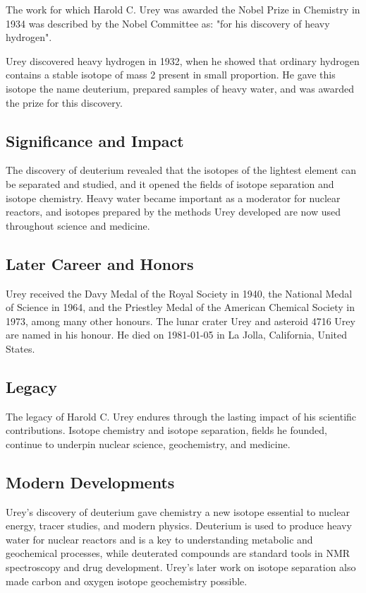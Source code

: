 The work for which Harold C. Urey was awarded the Nobel Prize in Chemistry in 1934 was described by the Nobel Committee as: "for his discovery of heavy hydrogen".

Urey discovered heavy hydrogen in 1932, when he showed that ordinary hydrogen contains a stable isotope of mass 2 present in small proportion.
He gave this isotope the name deuterium, prepared samples of heavy water, and was awarded the prize for this discovery.

\subsection*{Significance and Impact}

The discovery of deuterium revealed that the isotopes of the lightest element can be separated and studied, and it opened the fields of isotope separation and isotope chemistry.
Heavy water became important as a moderator for nuclear reactors, and isotopes prepared by the methods Urey developed are now used throughout science and medicine.

\subsection*{Later Career and Honors}

Urey received the Davy Medal of the Royal Society in 1940, the National Medal of Science in 1964, and the Priestley Medal of the American Chemical Society in 1973, among many other honours.
The lunar crater Urey and asteroid 4716 Urey are named in his honour.
He died on 1981-01-05 in La Jolla, California, United States.

\subsection*{Legacy}

The legacy of Harold C. Urey endures through the lasting impact of his scientific contributions.
Isotope chemistry and isotope separation, fields he founded, continue to underpin nuclear science, geochemistry, and medicine.

\subsection*{Modern Developments}

Urey's discovery of deuterium gave chemistry a new isotope essential to nuclear energy, tracer studies, and modern physics. Deuterium is used to produce heavy water for nuclear reactors and is a key to understanding metabolic and geochemical processes, while deuterated compounds are standard tools in NMR spectroscopy and drug development. Urey's later work on isotope separation also made carbon and oxygen isotope geochemistry possible.

